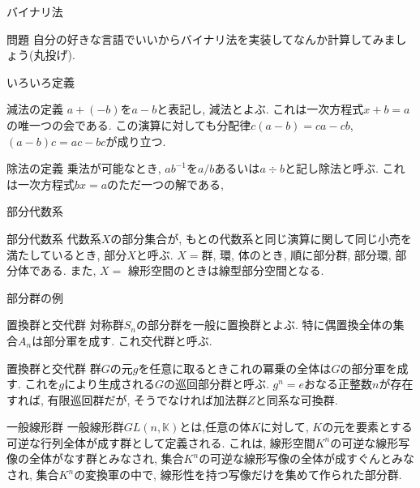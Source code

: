 \documentclass[dvipdfmx,11pt,notheorems]{beamer}
\begin{document}
\begin{frame}{バイナリ法}
  \begin{exampleblock}{問題}
    自分の好きな言語でいいからバイナリ法を実装してなんか計算してみましょう(丸投げ).
  \end{exampleblock}
\end{frame}
\begin{frame}{いろいろ定義}
  \begin{block}{減法の定義}
    $a + (-b)$を$a-b$と表記し, 減法とよぶ. これは一次方程式$x + b = a$の唯一つの会である. この演算に対しても分配律$c(a - b) = ca - cb$, $(a - b)c = ac - bc$が成り立つ.
  \end{block}
  \begin{block}{除法の定義}
    乗法が可能なとき, $a b^{-1}$を$a / b$あるいは$a \div b$と記し除法と呼ぶ. これは一次方程式$ bx = a$のただ一つの解である,
  \end{block}
\end{frame}

\begin{frame}{部分代数系}
  \begin{block}{部分代数系}
    代数系$X$の部分集合が, もとの代数系と同じ演算に関して同じ小売を満たしているとき, 部分$X$と呼ぶ. $X = $群, 環, 体のとき, 順に部分群, 部分環, 部分体である. また, $X =$ 線形空間のときは線型部分空間となる.
  \end{block}
\end{frame}

\begin{frame}{部分群の例}
  \begin{exampleblock}{置換群と交代群}
    対称群$S_n$の部分群を一般に置換群とよぶ. 特に偶置換全体の集合$A_n$は部分軍を成す. これ交代群と呼ぶ.
  \end{exampleblock}
  \begin{exampleblock}{置換群と交代群}
    群$G$の元$g$を任意に取るときこれの冪乗の全体は$G$の部分軍を成す. これを$g$により生成される$G$の巡回部分群と呼ぶ. $g^n = e$おなる正整数$n$が存在すれば, 有限巡回群だが, そうでなければ加法群$Z$と同系な可換群.
  \end{exampleblock}
  \begin{exampleblock}{一般線形群}
    一般線形群$GL(n, \mathbb{K})$とは,任意の体$K$に対して, $K$の元を要素とする可逆な行列全体が成す群として定義される. これは, 線形空間$K^n$の可逆な線形写像の全体がなす群とみなされ, 集合$K^n$の可逆な線形写像の全体が成すぐんとみなされ, 集合$K^n$の変換軍の中で, 線形性を持つ写像だけを集めて作られた部分群.
  \end{exampleblock}
\end{frame}
\end{document}
